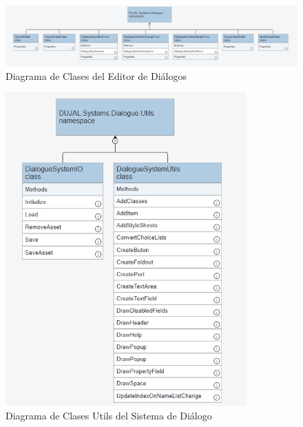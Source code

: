 \begin{figure}[H]
  \centering
    \includegraphics[width=500px,clip=true]{Dialogue_UML.png}
  \caption{Diagrama de Clases del Editor de Diálogos}
  \label{fig:dialogueUml1}
\end{figure}

\begin{figure}[H]
  \centering
    \includegraphics[width=350px,clip=true]{Dialogue_System_Utils.png}
  \caption{Diagrama de Clases Utils del Sistema de Diálogo}
  \label{fig:dialogueUml2}
\end{figure}


